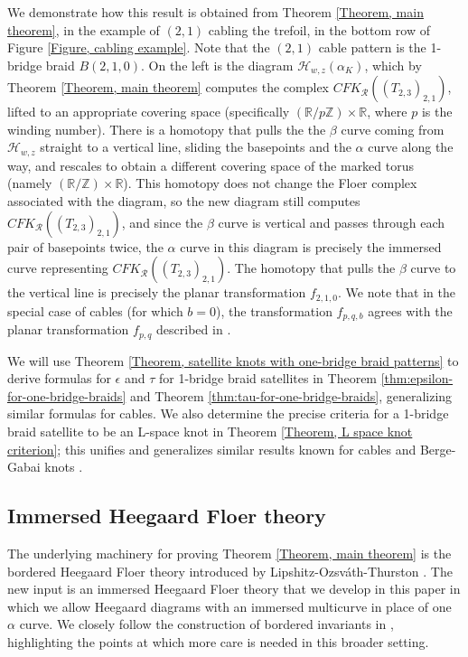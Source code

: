 \documentclass{amsart}
\newcommand{\Z}{\mathbb{Z}}
\newcommand{\R}{\mathbb{R}}
\theoremstyle{definition}
\theoremstyle{remark}
\numberwithin{equation}{section}
\numberwithin{equation}{section} \makeatletter
\begin{document}
We demonstrate how this result is obtained from Theorem \ref{Theorem, main theorem}, in the example of $(2,1)$ cabling the trefoil, in the bottom row of Figure \ref{Figure, cabling example}.  Note that the $(2,1)$ cable pattern is the 1-bridge braid $B(2,1,0)$. On the left is the diagram $\mathcal{H}_{w,z}(\alpha_K)$, which by Theorem \ref{Theorem, main theorem} computes the complex $CFK_\mathcal{R}((T_{2,3})_{2,1})$, lifted to an appropriate covering space (specifically $(\R/p\Z)\times \R$, where $p$ is the winding number). There is a homotopy that pulls the the $\beta$ curve coming from $\mathcal{H}_{w,z}$ straight to a vertical line, sliding the basepoints and the $\alpha$ curve along the way, and rescales to obtain a different covering space of the marked torus (namely $(\R/\Z)\times \R$). This homotopy does not change the Floer complex associated with the diagram, so the new diagram still computes $CFK_\mathcal{R}((T_{2,3})_{2,1})$, and since the $\beta$ curve is vertical and passes through each pair of basepoints twice, the $\alpha$ curve in this diagram is precisely the immersed curve representing $CFK_\mathcal{R}((T_{2,3})_{2,1})$. The homotopy that pulls the $\beta$ curve to the vertical line is precisely the planar transformation $f_{2,1,0}$. We note that in the special case of cables (for which $b=0$), the transformation $f_{p,q,b}$ agrees with the planar transformation $f_{p,q}$ described in \cite[Theorem 1]{Hanselman2023}.

We will use Theorem \ref{Theorem, satellite knots with one-bridge braid patterns} to derive formulas for  $\epsilon$ and $\tau$ for 1-bridge braid satellites in Theorem \ref{thm:epsilon-for-one-bridge-braids} and Theorem \ref{thm:tau-for-one-bridge-braids}, generalizing similar formulas for cables. We also determine the precise criteria for a 1-bridge braid satellite to be an L-space knot in Theorem \ref{Theorem, L space knot criterion}; this unifies and generalizes similar results known for cables and Berge-Gabai knots \cite{Hom2011, HLV2014}.


\subsection{Immersed Heegaard Floer theory} The underlying machinery for proving Theorem \ref{Theorem, main theorem} is the bordered Heegaard Floer theory introduced by Lipshitz-Ozsv\'ath-Thurston \cite{LOT18,Lipshitz2015}. The new input is an immersed Heegaard Floer theory that we develop in this paper in which we allow Heegaard diagrams with an immersed multicurve in place of one $\alpha$ curve. We closely follow the construction of bordered invariants in \cite{LOT18}, highlighting the points at which more care is needed in this broader setting.
\end{document}
